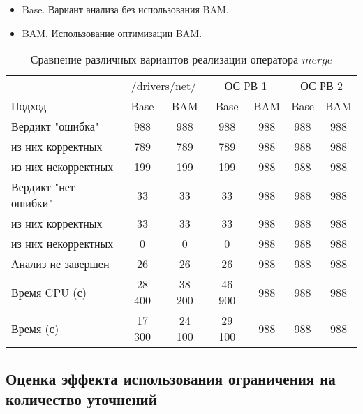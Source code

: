 \begin{itemize}
\item Base. Вариант анализа без использования BAM.
\item BAM. Использование оптимизации BAM.
\end{itemize}

\begin{center}
  \begin{table}[h]\footnotesize
  	\label{table-drivers-lock-refinement}
    \caption{Сравнение различных вариантов реализации оператора $merge$}
    \begin{tabular}{ | l | c | c | c | c | c | c |}
      \hline
      		& 		 \multicolumn{2}{|c|}{/drivers/net/} & 		 \multicolumn{2}{|c|}{ОС РВ 1} & 		 \multicolumn{2}{|c|}{ОС РВ 2} \\
      Подход         				& Base  & BAM 	& Base  	& BAM 	& Base   & BAM \\ \hline
      Вердикт "ошибка" 				& 988   & 988   & 988   	& 988   & 988    & 988  \\ 
  \hspace{0.5cm} из них корректных 	& 789 	& 789 	& 789   	& 988  	& 988    & 988 \\ 
  \hspace{0.5cm} из них некорректных & 199	& 199 	& 199   	& 988   & 988    & 988  \\ \hline
      Вердикт "нет ошибки"  		& 33    & 33    & 33   		& 988  	& 988    & 988   \\ 
  \hspace{0.5cm} из них корректных 	& 33 	& 33    & 33   		& 988   & 988    & 988  \\
  \hspace{0.5cm} из них некорректных & 0 	& 0    	& 0    		& 988  	& 988    & 988 \\ \hline
      Анализ не завершен       		& 26    & 26    & 26   		& 988   & 988    & 988\\ \hline
      Время CPU (с)   				& 28 400 & 38 200 & 46 900  & 988   & 988    & 988\\ 
      Время (с)  					& 17 300 & 24 100 & 29 100  & 988  	& 988    & 988   \\
      \hline
    \end{tabular}
  \end{table}
\end{center}

\subsection{Оценка эффекта использования ограничения на количество уточнений}

